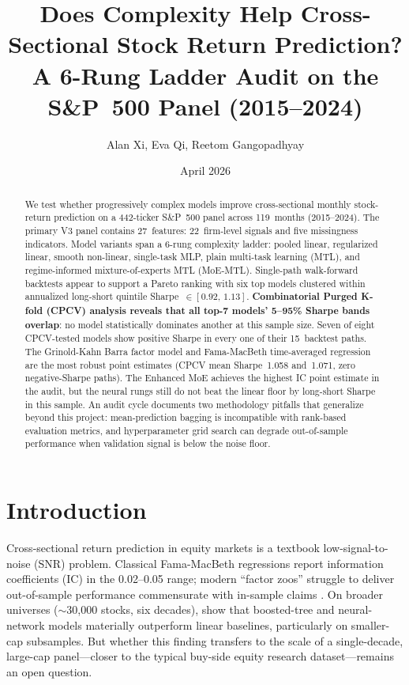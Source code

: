 \documentclass[11pt]{article}
\title{Does Complexity Help Cross-Sectional Stock Return Prediction? \\
       \large A 6-Rung Ladder Audit on the S\&P~500 Panel (2015--2024)}
\author{Alan Xi, Eva Qi, Reetom Gangopadhyay}
\date{April 2026}
\begin{document}
\maketitle

\begin{abstract}
\noindent
We test whether progressively complex models improve cross-sectional
monthly stock-return prediction on a 442-ticker S\&P~500 panel across
119~months (2015--2024). The primary V3 panel contains 27~features:
22~firm-level signals and five missingness indicators. Model variants
span a 6-rung complexity ladder: pooled linear, regularized linear,
smooth non-linear, single-task MLP, plain multi-task learning (MTL), and
regime-informed mixture-of-experts MTL (MoE-MTL). Single-path
walk-forward backtests appear to support a Pareto ranking with six top
models clustered within annualized long-short quintile
Sharpe~$\in[0.92,\,1.13]$. \textbf{Combinatorial Purged K-fold (CPCV)
analysis reveals that all top-7 models' 5--95\% Sharpe bands overlap}:
no model statistically dominates another at this sample size. Seven of
eight CPCV-tested models show positive Sharpe in every one of their
15~backtest paths. The Grinold-Kahn Barra factor model and
Fama-MacBeth time-averaged regression are the most robust point
estimates (CPCV mean Sharpe~1.058 and~1.071, zero negative-Sharpe
paths). The Enhanced MoE achieves the highest IC point estimate in the
audit, but the neural rungs still do not beat the linear floor by
long-short Sharpe in this sample. An audit cycle documents two
methodology pitfalls that generalize beyond this project: mean-prediction
bagging is incompatible with rank-based evaluation metrics, and
hyperparameter grid search can degrade out-of-sample performance when
validation signal is below the noise floor.
\end{abstract}

\section{Introduction}\label{sec:intro}

Cross-sectional return prediction in equity markets is a textbook
low-signal-to-noise (SNR) problem. Classical Fama-MacBeth regressions
report information coefficients (IC) in the 0.02--0.05 range; modern
``factor zoos'' struggle to deliver out-of-sample performance
commensurate with in-sample claims \citep{harvey_zoo, hou_replication}.
On broader universes ($\sim$30{,}000 stocks, six decades),
\citet{gu_kelly_xiu} show that boosted-tree and neural-network models
materially outperform linear baselines, particularly on smaller-cap
subsamples. But whether this finding transfers to the scale of a
single-decade, large-cap panel---closer to the typical buy-side equity
research dataset---remains an open question.
\end{document}
